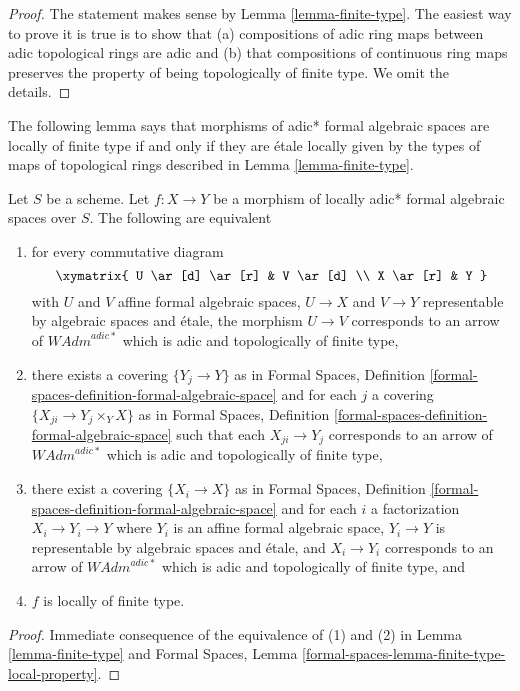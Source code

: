\begin{proof}
The statement makes sense by Lemma \ref{lemma-finite-type}.
The easiest way to prove it is true is to show that
(a) compositions of adic ring maps between adic topological rings
are adic and (b) that compositions of continuous ring maps
preserves the property of being topologically of finite type.
We omit the details.
\end{proof}

\noindent
The following lemma says that morphisms of adic* formal algebraic spaces
are locally of finite type if and only if they are \'etale locally given
by the types of maps of topological rings described in
Lemma \ref{lemma-finite-type}.

\begin{lemma}
\label{lemma-finite-type-morphisms}
Let $S$ be a scheme. Let $f : X \to Y$ be a morphism of
locally adic* formal algebraic spaces over $S$.
The following are equivalent
\begin{enumerate}
\item for every commutative diagram
$$
\xymatrix{
U \ar[d] \ar[r] & V \ar[d] \\
X \ar[r] & Y
}
$$
with $U$ and $V$ affine formal algebraic spaces, $U \to X$ and $V \to Y$
representable by algebraic spaces and \'etale, the morphism $U \to V$
corresponds to an arrow of $\textit{WAdm}^{adic*}$ which is
adic and topologically of finite type,
\item there exists a covering $\{Y_j \to Y\}$ as in
Formal Spaces,
Definition \ref{formal-spaces-definition-formal-algebraic-space}
and for each $j$
a covering $\{X_{ji} \to Y_j \times_Y X\}$ as in
Formal Spaces,
Definition \ref{formal-spaces-definition-formal-algebraic-space}
such that each $X_{ji} \to Y_j$  corresponds
to an arrow of $\textit{WAdm}^{adic*}$ which is adic and
topologically of finite type,
\item there exist a covering $\{X_i \to X\}$ as in
Formal Spaces,
Definition \ref{formal-spaces-definition-formal-algebraic-space}
and for each $i$ a factorization $X_i \to Y_i \to Y$ where $Y_i$
is an affine formal algebraic space, $Y_i \to Y$ is representable
by algebraic spaces and \'etale, and $X_i \to Y_i$ corresponds
to an arrow of $\textit{WAdm}^{adic*}$ which is adic and topologically
of finite type, and
\item $f$ is locally of finite type.
\end{enumerate}
\end{lemma}

\begin{proof}
Immediate consequence of the equivalence of (1) and (2) in
Lemma \ref{lemma-finite-type} and
Formal Spaces, Lemma
\ref{formal-spaces-lemma-finite-type-local-property}.
\end{proof}










